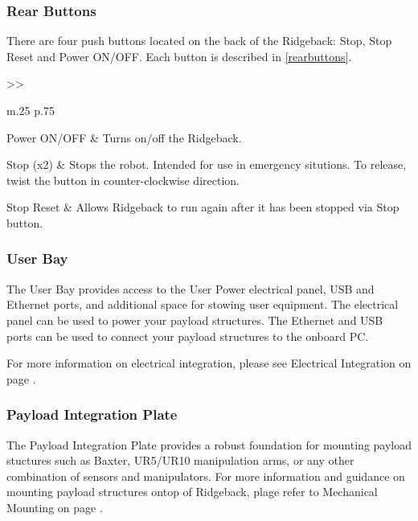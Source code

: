 \documentclass[]{clearpath-latex/clearpath-manual}
\begin{document}
\subsubsection{Rear Buttons}

There are four push buttons located on the back of the Ridgeback: Stop, Stop Reset and Power ON/OFF.   Each button is described in \autoref{rearbuttons}. 

\bgroup
\def\arraystretch{1.2}%
\begin{table}[h]
	\centering
	\begin{tabular}{>{}>{\raggedright}m{.25\textwidth} p{.75\textwidth}} \hline 

	Power ON/OFF & Turns on/off the Ridgeback. \\ \hline

	Stop (x2) & Stops the robot.  Intended for use in emergency situtions.  To release, twist the button in counter-clockwise direction.  \\ \hline	
	
	Stop Reset & Allows Ridgeback to run again after it has been stopped via Stop button.    \\ \hline	
	
	\end{tabular}
\newline
\caption{Ridgeback Rear Buttons}
\label{rearbuttons}
\end{table}
\egroup


\subsubsection{User Bay}

The User Bay provides access to the User Power electrical panel, USB and Ethernet ports, and additional space for stowing user equipment.  The electrical panel can be used to power your payload structures.   The Ethernet and USB ports can be used to connect your payload structures to the onboard PC.  

For more information on electrical integration, please see Electrical Integration on page \pageref{electrical}.


\subsubsection{Payload Integration Plate}

The Payload Integration Plate provides a robust foundation for mounting payload stuctures such as Baxter, UR5/UR10 manipulation arms, or any other combination of sensors and manipulators.   For more information and guidance on mounting payload structures ontop of Ridgeback, plage refer to Mechanical Mounting on page \pageref{mechanical}.
\end{document}
